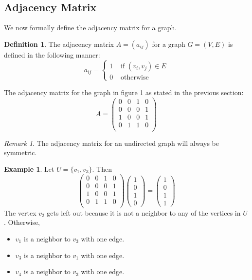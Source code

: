\documentclass[10pt, letterpaper]{article}
\theoremstyle{remark}
\newtheorem{rem}{Remark}
\theoremstyle{definition}
\newtheorem{defn}{Definition}
\newtheorem{ex}{Example}
\begin{document}
\subsection{Adjacency Matrix}

We now formally define the adjacency matrix for a graph.

\begin{defn}
The adjacency matrix $A=(a_{ij})$ for a graph $G=(V,E)$ is defined in the following manner:
\[
	a_{ij} = \begin{cases}
		1 &\text{ if } (v_i,v_j) \in E \\
		0 &\text{ otherwise}
	\end{cases}
\]
\end{defn}

The adjacency matrix for the graph in figure 1 as stated in the previous section:
\[
	A = \begin{pmatrix}
		0 & 0 & 1 & 0 \\
		0 & 0 & 0 & 1 \\
		1 & 0 & 0 & 1 \\
		0 & 1 & 1 & 0 \\
	\end{pmatrix}
\]

\begin{rem} The adjacency matrix for an undirected graph will always be symmetric.
\end{rem}

\begin{ex}
Let $U=\{v_1, v_3\}$. Then
\[
	\begin{pmatrix}
		0 & 0 & 1 & 0 \\
		0 & 0 & 0 & 1 \\
		1 & 0 & 0 & 1 \\
		0 & 1 & 1 & 0 \\
	\end{pmatrix}
	\begin{pmatrix}
		1 \\ 0 \\ 1 \\ 0 
	\end{pmatrix} =
	\begin{pmatrix}
		1 \\ 0 \\ 1 \\ 1
	\end{pmatrix}
\]
The vertex $v_2$ gets left out because it is not a neighbor to any of the vertices in $U$. Otherwise,
\begin{itemize}
	\item $v_1$ is a neighbor to $v_3$ with one edge.
	\item $v_3$ is a neighbor to $v_1$ with one edge.
	\item $v_4$ is a neighbor to $v_3$ with one edge.
\end{itemize}
\end{ex}
\end{document}
